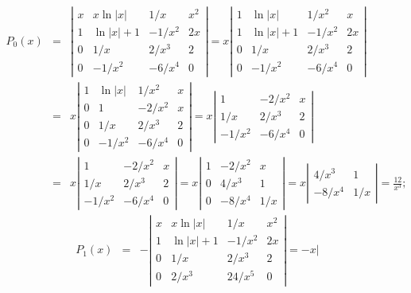 \documentclass{ximera}
\begin{document}
\begin{problem}
\begin{enumerate}
\begin{solution}
\begin{eqnarray*}
P_0(x)&=&
\left|\begin{array}{cccc}
x&x\ln|x|&1/x&x^2\\
1&\ln|x|+1&-1/x^2&2x\\
0&1/x&2/x^3&2\\
0&-1/x^2&-6/x^4&0
\end{array}\right|=
x\left|\begin{array}{ccrc}
1&\ln|x|&1/x^2&x\\
1&\ln|x|+1&-1/x^2&2x\\
0&1/x&2/x^3&2\\
0&-1/x^2&-6/x^4&0
\end{array}\right|\\
&=&x\left|\begin{array}{ccrc}
1&\ln|x|&1/x^2&x\\
0&1&-2/x^2&x\\
0&1/x&2/x^3&2\\
0&-1/x^2&-6/x^4&0
\end{array}\right|
=x\left|\begin{array}{ccrc}
1&-2/x^2&x\\
1/x&2/x^3&2\\
-1/x^2&-6/x^4&0
\end{array}\right|\\
&=&x\left|\begin{array}{crc}
1&-2/x^2&x\\
1/x&2/x^3&2\\
-1/x^2&-6/x^4&0
\end{array}\right|
=x\left|\begin{array}{crc}
1&-2/x^2&x\\
0&4/x^3&1\\
0&-8/x^4&1/x
\end{array}\right|
=x\left|\begin{array}{rc}
4/x^3&1\\
-8/x^4&1/x
\end{array}\right|=\frac{12}{x^3};
\end{eqnarray*}
\begin{eqnarray*}
P_1(x)&=&
-\left|\begin{array}{cccc}
x&x\ln|x|&1/x&x^2\\
1&\ln|x|+1&-1/x^2&2x\\
0&1/x&2/x^3&2\\
0&2/x^3&24/x^5&0
\end{array}\right|=
-x\left|\begin{array}{cccc}

\end{array}
\end{eqnarray*}
\end{solution}
\end{enumerate}
\end{problem}
\end{document}
